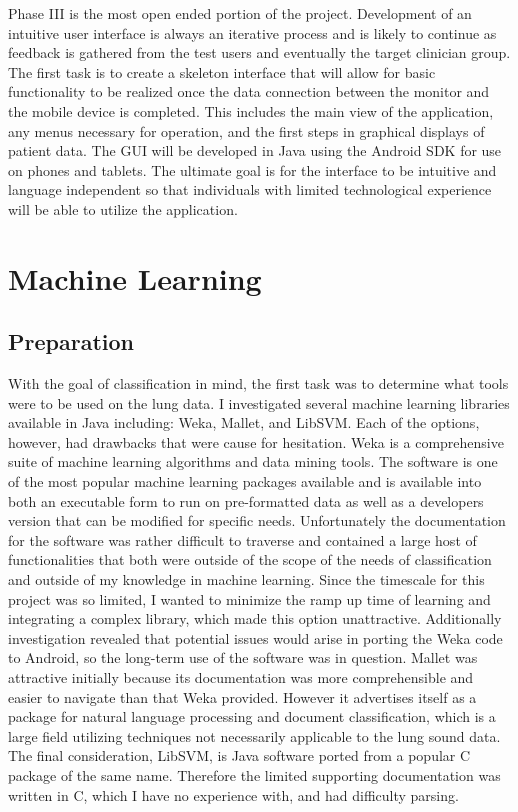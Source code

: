 \documentclass{article}
\begin{document}
Phase III is the most open ended portion of the project. Development of an intuitive user interface is always an iterative process and is likely to continue as feedback is gathered from the test users and eventually the target clinician group. The first task is to create a skeleton interface that will allow for basic functionality to be realized once the data connection between the monitor and the mobile device is completed. This includes the main view of the application, any menus necessary for operation, and the first steps in graphical displays of patient data. The GUI will be developed in Java using the Android SDK for use on phones and tablets. The ultimate goal is for the interface to be intuitive and language independent so that individuals with limited technological experience will be able to utilize the application. \\

\section{Machine Learning}

\subsection{Preparation}

With the goal of classification in mind, the first task was to determine what tools were to be used on the lung data. I investigated several machine learning libraries available in Java including: Weka, Mallet, and LibSVM. Each of the options, however, had drawbacks that were cause for hesitation. Weka is a comprehensive suite of machine learning algorithms and data mining tools. The software is one of the most popular machine learning packages available and is available into both an executable form to run on pre-formatted data as well as a developers version that can be modified for specific needs. Unfortunately the documentation for the software was rather difficult to traverse and contained a large host of functionalities that both were outside of the scope of the needs of classification and outside of my knowledge in machine learning. Since the timescale for this project was so limited, I wanted to minimize the ramp up time of learning and integrating a complex library, which made this option unattractive. Additionally investigation revealed that potential issues would arise in porting the Weka code to Android, so the long-term use of the software was in question. Mallet was attractive initially because its documentation was more comprehensible and easier to navigate than that Weka provided. However it advertises itself as a package for natural language processing and document classification, which is a large field utilizing techniques not necessarily applicable to the lung sound data. The final consideration, LibSVM, is Java software ported from a popular C package of the same name. Therefore the limited supporting documentation was written in C, which I have no experience with, and had difficulty parsing.\\
\end{document}
